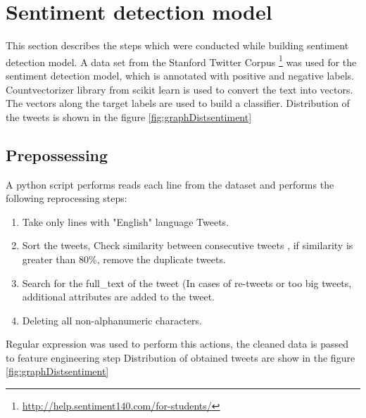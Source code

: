 \section{Sentiment detection model} \label{snetimentdetectionmodel}

This section describes the steps which were conducted while building sentiment detection
model. A data set from the Stanford Twitter Corpus \footnote{\url{http://help.sentiment140.com/for-students/}} was used for the sentiment detection model, which is annotated with positive and negative labels. Countvectorizer \cite{scikit-learn} library from scikit learn is used to convert the text into vectors. The vectors along the target labels are used to build a classifier. Distribution of the tweets is shown in the figure \ref{fig:graphDistsentiment} 
 




\subsection{Prepossessing}
A python script performs reads each line from the dataset and performs the following reprocessing steps:
\begin{enumerate}
    \item Take only lines with "English" language Tweets.
    \item Sort the tweets, Check similarity between consecutive tweets , if similarity is greater than 80\%, remove the duplicate tweets.
    \item Search for the full\_text of the tweet (In cases of re-tweets or too big tweets, additional attributes are added to the tweet.
    \item Deleting all non-alphanumeric characters.
\end{enumerate}
Regular expression was used to perform this actions, the cleaned data is passed to feature engineering step Distribution of obtained tweets are show in the figure \ref{fig:graphDistsentiment}


